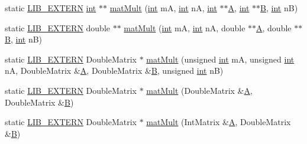\begin{DoxyCompactItemize}
\item 
static \hyperlink{libutil_8h_a48cc004c21e097c0d7c1c5fa8dc03b96}{L\+I\+B\+\_\+\+E\+X\+T\+E\+RN} \hyperlink{lp__lib_8h_adeb9ec6400320e4923ac9d836d509ddb}{int} $\ast$$\ast$ \hyperlink{class_l_i_b___l_a_1_1_util_abc9f3aa8448b800e16b9876860f05d5d}{mat\+Mult} (\hyperlink{lp__lib_8h_adeb9ec6400320e4923ac9d836d509ddb}{int} mA, \hyperlink{lp__lib_8h_adeb9ec6400320e4923ac9d836d509ddb}{int} nA, \hyperlink{lp__lib_8h_adeb9ec6400320e4923ac9d836d509ddb}{int} $\ast$$\ast$\hyperlink{fmt_8h_a955f504eccf76b4eb2489c0adab03121}{A}, \hyperlink{lp__lib_8h_adeb9ec6400320e4923ac9d836d509ddb}{int} $\ast$$\ast$\hyperlink{lread_8c_a111da81ae5883147168bbb8366377b10}{B}, \hyperlink{lp__lib_8h_adeb9ec6400320e4923ac9d836d509ddb}{int} nB)
\item 
static \hyperlink{libutil_8h_a48cc004c21e097c0d7c1c5fa8dc03b96}{L\+I\+B\+\_\+\+E\+X\+T\+E\+RN} double $\ast$$\ast$ \hyperlink{class_l_i_b___l_a_1_1_util_a156b88c50890c93683c002b7a0f22a88}{mat\+Mult} (\hyperlink{lp__lib_8h_adeb9ec6400320e4923ac9d836d509ddb}{int} mA, \hyperlink{lp__lib_8h_adeb9ec6400320e4923ac9d836d509ddb}{int} nA, double $\ast$$\ast$\hyperlink{fmt_8h_a955f504eccf76b4eb2489c0adab03121}{A}, double $\ast$$\ast$\hyperlink{lread_8c_a111da81ae5883147168bbb8366377b10}{B}, \hyperlink{lp__lib_8h_adeb9ec6400320e4923ac9d836d509ddb}{int} nB)
\item 
static \hyperlink{libutil_8h_a48cc004c21e097c0d7c1c5fa8dc03b96}{L\+I\+B\+\_\+\+E\+X\+T\+E\+RN} Double\+Matrix $\ast$ \hyperlink{class_l_i_b___l_a_1_1_util_a282add89f6fa75cb32e7552b18b4bff0}{mat\+Mult} (unsigned \hyperlink{lp__lib_8h_adeb9ec6400320e4923ac9d836d509ddb}{int} mA, unsigned \hyperlink{lp__lib_8h_adeb9ec6400320e4923ac9d836d509ddb}{int} nA, Double\+Matrix \&\hyperlink{fmt_8h_a955f504eccf76b4eb2489c0adab03121}{A}, Double\+Matrix \&\hyperlink{lread_8c_a111da81ae5883147168bbb8366377b10}{B}, unsigned \hyperlink{lp__lib_8h_adeb9ec6400320e4923ac9d836d509ddb}{int} nB)
\item 
static \hyperlink{libutil_8h_a48cc004c21e097c0d7c1c5fa8dc03b96}{L\+I\+B\+\_\+\+E\+X\+T\+E\+RN} Double\+Matrix $\ast$ \hyperlink{class_l_i_b___l_a_1_1_util_a842f660dbd1e0eec33f400c85fc05177}{mat\+Mult} (Double\+Matrix \&\hyperlink{fmt_8h_a955f504eccf76b4eb2489c0adab03121}{A}, Double\+Matrix \&\hyperlink{lread_8c_a111da81ae5883147168bbb8366377b10}{B})
\item 
static \hyperlink{libutil_8h_a48cc004c21e097c0d7c1c5fa8dc03b96}{L\+I\+B\+\_\+\+E\+X\+T\+E\+RN} Double\+Matrix $\ast$ \hyperlink{class_l_i_b___l_a_1_1_util_a1c07f17145c4cc1e6c19b693ca5047d2}{mat\+Mult} (Int\+Matrix \&\hyperlink{fmt_8h_a955f504eccf76b4eb2489c0adab03121}{A}, Double\+Matrix \&\hyperlink{lread_8c_a111da81ae5883147168bbb8366377b10}{B})

\end{DoxyCompactItemize}
